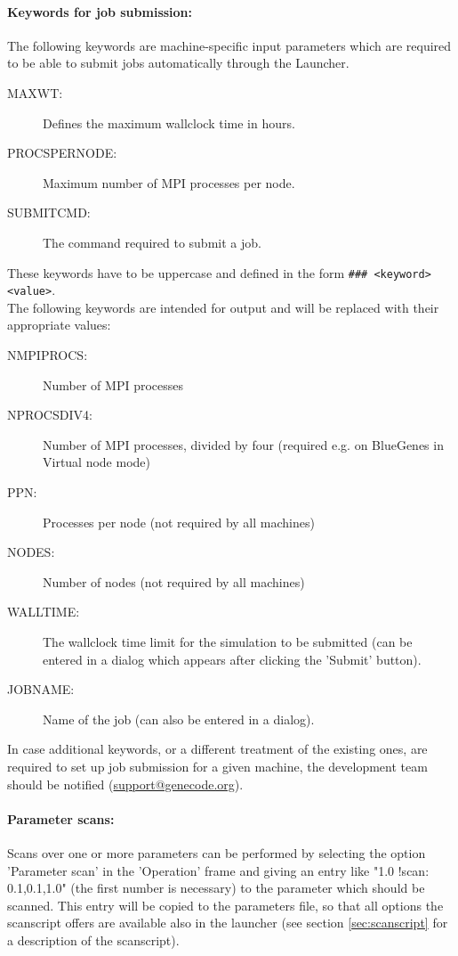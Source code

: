 \documentclass[12pt]{article}
\begin{document}
\paragraph{Keywords for job submission:}
The following keywords are machine-specific input parameters which are required to be able to submit
jobs automatically through the Launcher.
\begin{description}
  \item[MAXWT:] Defines the maximum wallclock time in hours.
  \item[PROCSPERNODE:] Maximum number of MPI processes per node.
  \item[SUBMITCMD:] The command required to submit a job.
 \end{description}
These keywords have to be uppercase and defined in the form \texttt{\#\#\#~<keyword> <value>}.\\
The following keywords are intended for output and will be replaced with their appropriate values:
\begin{description}
  \item[NMPIPROCS:] Number of MPI processes
  \item[NPROCSDIV4:] Number of MPI processes, divided by four (required e.g. on BlueGenes in Virtual
    node mode)
  \item[PPN:] Processes per node (not required by all machines)
  \item[NODES:] Number of nodes (not required by all machines)
  \item[WALLTIME:] The wallclock time limit for the simulation to be submitted (can be entered in a
    dialog which appears after clicking the 'Submit' button).
  \item[JOBNAME:] Name of the job (can also be entered in a dialog).
\end{description}
In case additional keywords, or a different treatment of the existing ones, are required to set up
job submission for a given machine, the \gene development team should be notified (\href{mailto:support@genecode.org}{support@genecode.org}).

\paragraph{Parameter scans:}
Scans over one or more parameters can be performed by selecting the option 'Parameter scan' in the
'Operation' frame and giving an entry like "1.0 !scan: 0.1,0.1,1.0" (the first number is necessary)
to the parameter which should be scanned.
This entry will be copied to the parameters file, so that all options the scanscript offers are
available also in the launcher (see section \ref{sec:scanscript} for a description of the scanscript).
\end{document}
